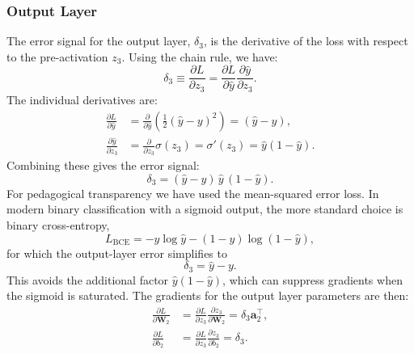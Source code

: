 \documentclass[%
  reprint,
  superscriptaddress,
  showpacs,
  showkeys,
  amsmath,amssymb,
  pra,
  longbibliography,
  floatfix,
  x11names
]{revtex4-2}
\begin{document}
\subsubsection{Output Layer}
The error signal for the output layer, $\delta_3$, is the derivative of the loss with respect to the pre-activation $z_3$. Using the chain rule, we have:
\begin{equation}
\delta_3 \equiv \frac{\partial L}{\partial z_3} = \frac{\partial L}{\partial \hat{y}} \frac{\partial \hat{y}}{\partial z_3}.
\end{equation}
The individual derivatives are:
\begin{align}
\frac{\partial L}{\partial \hat{y}} &= \frac{\partial}{\partial \hat{y}} \left( \frac{1}{2}(\hat{y}-y)^2 \right) = (\hat{y}-y), \\
\frac{\partial \hat{y}}{\partial z_3} &= \frac{\partial}{\partial z_3} \sigma(z_3) = \sigma'(z_3) = \hat{y}(1-\hat{y}).
\end{align}
Combining these gives the error signal:
\begin{equation}
\delta_3 = (\hat{y}-y)\,\hat{y}\,(1-\hat{y}).
\end{equation}
For pedagogical transparency we have used the mean-squared error loss.
In modern binary classification with a sigmoid output, the more standard choice is binary cross-entropy,
\begin{equation}
L_{\mathrm{BCE}}=-y\log\hat{y}-(1-y)\log(1-\hat{y}),
\end{equation}
for which the output-layer error simplifies to
\begin{equation}
\delta_3=\hat{y}-y.
\end{equation}
This avoids the additional factor $\hat{y}(1-\hat{y})$, which can suppress gradients when the sigmoid is saturated.
The gradients for the output layer parameters are then:
\begin{align}
\frac{\partial L}{\partial \bm{W}_2} &= \frac{\partial L}{\partial z_3} \frac{\partial z_3}{\partial \bm{W}_2} = \delta_3 \bm{a}_2^\intercal, \\
\frac{\partial L}{\partial b_2} &= \frac{\partial L}{\partial z_3} \frac{\partial z_3}{\partial b_2} = \delta_3.
\end{align}
\end{document}
